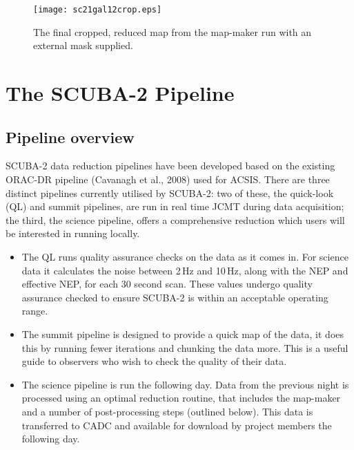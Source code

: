 \documentclass[twoside,11pt]{article}
\newcommand{\htmladdimg}[1]{}
\newcommand{\xlabel}[1]{}
\renewcommand{\_}{\texttt{\symbol{95}}}
\newcommand{\myfig}[5]{
  \begin{figure}#2
    \centering\texttt{[image: \#1.eps]}
    \typeout{#1.eps inserted on page \arabic{page}}
    \caption{\label{#4}\small #5}
  \end{figure}
}
\newcommand{\myfig}[5]{
    \label{#4} \htmladdimg{#1.png}\\
    \\
    Figure: #5\\
  }
\begin{document}

\begin{figure}[t!]
\begin{center}
\texttt{[image: sc21\_gal12\_crop.eps]}
\caption{\small The final cropped, reduced map from the map-maker run with
an external mask supplied.}
\label{fig:crop_map}
\end{center}
\end{figure}


\clearpage
\section{\xlabel{pipeline}The SCUBA-2 Pipeline}
\label{sec:pipe}
\subsection{\xlabel{pl_overview}Pipeline overview}

SCUBA-2 data reduction pipelines have been developed based on the
existing ORAC-DR pipeline (Cavanagh et al., 2008\cite{oracdr}) used
for ACSIS. There are three distinct pipelines currently utilised by
SCUBA-2: two of these, the quick-look (QL) and summit pipelines, are
run in real time JCMT during data acquisition; the third, the science
pipeline, offers a comprehensive reduction which users will be
interested in running locally.

\begin{itemize}
\item The QL runs quality assurance checks on the data as it comes in.
For science data it calculates the noise between 2\,Hz and 10\,Hz,
along with the NEP and effective NEP, for each 30 second scan. These
values undergo quality assurance checked to ensure SCUBA-2 is within
an acceptable operating range.
\item The summit pipeline is designed to provide a quick map of the
data, it does this by running fewer iterations and chunking the data
more. This is a useful guide to observers who wish to check the
quality of their data.
\item The science pipeline is run the following day. Data from the
previous night is processed using an optimal reduction routine, that
includes the map-maker and a number of post-processing steps (outlined
below).  This data is transferred to CADC and available for download
by project members the following day.
\end{itemize}
\end{document}
